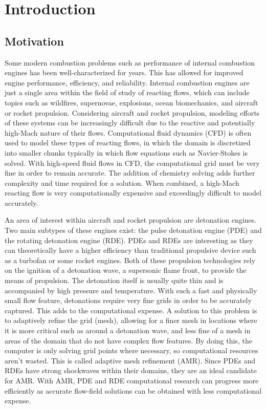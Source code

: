 \chapter{Introduction}
\label{introchap}


\section{Motivation}
Some modern combustion problems such as performance of internal combustion engines has been well-characterized for years. This has allowed for improved engine performance, efficiency, and reliability. Internal combustion engines are just a single area within the field of study of reacting flows, which can include topics such as wildfires, supernovae, explosions, ocean biomechanics, and aircraft or rocket propulsion. Considering aircraft and rocket propulsion, modeling efforts of these systems can be increasingly difficult due to the reactive and potentially high-Mach nature of their flows. Computational fluid dynamics (CFD) is often used to model these types of reacting flows, in which the domain is discretized into smaller chunks typically in which flow equations such as Navier-Stokes is solved. With high-speed fluid flows in CFD, the computational grid must be very fine in order to remain accurate. The addition of chemistry solving adds further complexity and time required for a solution. When combined, a high-Mach reacting flow is very computationally expensive and exceedingly difficult to model accurately. 

An area of interest within aircraft and rocket propulsion are detonation engines. Two main subtypes of these engines exist: the pulse detonation engine (PDE) and the rotating detonation engine (RDE). PDEs and RDEs are interesting as they can theoretically have a higher efficiency than traditional propulsive device such as a turbofan or some rocket engines. Both of these propulsion technologies rely on the ignition of a detonation wave, a supersonic flame front, to provide the means of propulsion. The detonation itself is usually quite thin and is accompanied by high pressure and temperature. With such a fast and physically small flow feature, detonations require very fine grids in order to be accurately captured. This adds to the computational expense. A solution to this problem is to adaptively refine the grid (mesh), allowing for a finer mesh in locations where it is more critical such as around a detonation wave, and less fine of a mesh in areas of the domain that do not have complex flow features. By doing this, the computer is only solving grid points where necessary, so computational resources aren't wasted. This is called adaptive mesh refinement (AMR). Since PDEs and RDEs have strong shockwaves within their domains, they are an ideal candidate for AMR. With AMR, PDE and RDE computational research can progress more efficiently as accurate flow-field solutions can be obtained with less computational expense. 

